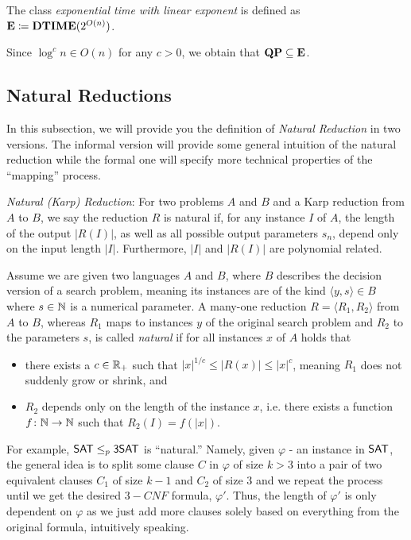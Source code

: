\documentclass[11pt]{article}
\begin{document}
\begin{definition}
  The class \emph{exponential time with linear exponent} is defined as
	$\mathbf{E} \coloneqq \mathbf{DTIME}(2^{O(n)})$.
\end{definition}

Since $\log^c n \in O(n)$ for any $c > 0$, we obtain that
$\mathbf{QP} \subseteq \mathbf{E}$.


\subsection{Natural Reductions}

In this subsection, we will provide you the definition of \textit{Natural Reduction} in two versions.
The informal version will provide some general intuition of the natural reduction while the formal one will specify more technical properties of the ``mapping'' process.  

\begin{definition}
	\textit{Natural (Karp) Reduction}: For two problems $A$ and $B$ and a Karp reduction from $A$ to $B$, we say the reduction $R$ is natural if, for any instance $I$ of $A$, the length of the output $|R(I)|$, as well as all possible output parameters $s_n$, depend only on the input length $|I|$. Furthermore, $|I|$ and $|R(I)|$ are polynomial related.
\end{definition}

\begin{definition}
  Assume we are given two languages $A$ and $B$, where $B$ describes the
  decision version of a search problem, meaning its instances are of the kind
  $\langle y, s \rangle \in B$ where $s \in {\mathbb{N}}$ is a numerical parameter.
  A many-one reduction $R = \langle R_1, R_2 \rangle$ from $A$ to $B$, whereas
  $R_1$ maps to instances $y$ of the original search problem and $R_2$ to the
  parameters $s$, is called \emph{natural} if for all instances $x$ of $A$ holds
  that
  \begin{itemize}
    \item there exists a $c \in {\mathbb R}_+$ such that
      $|x|^{1/c} \le |R(x)| \le |x|^c$, meaning $R_1$ does not suddenly grow or
      shrink, and
    \item $R_2$ depends only on the length of the instance $x$, i.e. there
      exists a function $f \colon {\mathbb{N}} \to {\mathbb{N}}$ such that $R_2(I) = f(|x|)$.
  \end{itemize}
\end{definition}
	
	For example, $\mathsf{SAT} \leq_p \mathsf{3SAT}$ is ``natural.'' Namely, given $\varphi$ - an instance in $\mathsf{SAT}$, the general idea is to split some clause $C$ in $\varphi$ of size $k > 3$ into a pair of two equivalent clauses $C_1$ of size $k - 1$ and $C_2$ of size $3$ and we repeat the process until we get the desired $3-CNF$ formula, $\varphi'$. Thus, the length of $\varphi'$ is only dependent on $\varphi$ as we just add more clauses solely based on everything from the original formula, intuitively speaking.
	
\end{document}

